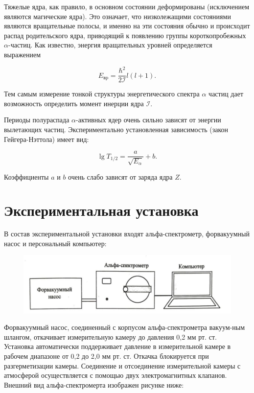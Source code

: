 \documentclass[a4paper, 12pt]{article}
\begin{document}
    Тяжелые ядра, как правило, в основном состоянии деформированы (исключением являются магические ядра). Это означает, что низколежащими состояниями являются вращательные полосы, и именно на эти состояния обычно и происходит распад родительского ядра, приводящий к появлению группы короткопробежных $\alpha$-частиц. Как известно, энергия вращательных уровней определяется выражением

    $$
    E_\text{вp}=\frac{\hbar^2}{2 \mathcal{I}} l(l+1).
    $$

    Тем самым измерение тонкой структуры энергетического спектра $\alpha$ частиц дает возможность определить момент инерции ядра $\mathcal{I}$.

    Периоды полураспада $\alpha$-активных ядер очень сильно зависят от энергии вылетающих частиц. Экспериментально установленная зависимость (закон Гейгера-Нэттола) имеет вид:

    \begin{equation}\label{eq:gey_net}
    \lg T_{1 / 2}=\frac{a}{\sqrt{E_\alpha}}+b .
    \end{equation}

    Коэффициенты $a$ и $b$ очень слабо зависят от заряда ядра $Z$.


\section {Экспериментальная установка}

    В состав экспериментальной установки входят альфа-спектрометр, форвакуумный насос и персональный компьютер:

    \begin{figure}[H]
        \centering
        \includegraphics[width=0.7\linewidth]{res/1.png}
    \end{figure}

    Форвакуумный насос, соединенный с корпусом альфа-спектрометра вакуум-ным шлангом, откачивает измерительную камеру до давления 0,2 мм рт. ст.\\
    Установка автоматически поддерживает давление в измерительной камере в рабочем диапазоне от 0,2 до 2,0 мм рт. ст. Откачка блокируется при разгерметизации камеры. Соединение и отсоединение измерительной камеры с атмосферой осуществляется с помощью двух электромагнитных клапанов.\\
    Внешний вид альфа-спектромерта изображен рисунке ниже:
\end{document}
